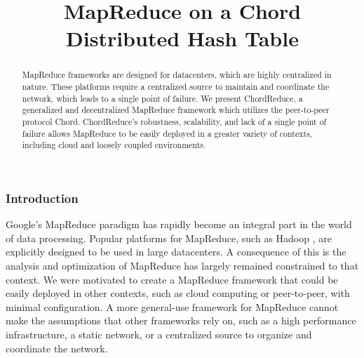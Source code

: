 \documentclass{article}
\title{MapReduce on a Chord Distributed Hash Table}
\date{} %
\begin{document}
\maketitle

\begin{abstract}

MapReduce frameworks are designed for datacenters, which are highly centralized in nature.  These platforms require a centralized source to maintain and coordinate the network, which leads to a single point of failure.  We present ChordReduce, a generalized and decentralized MapReduce framework which utilizes the peer-to-peer protocol Chord.  ChordReduce's robustness, scalability, and lack of a single point of failure allows MapReduce to be easily deployed in a greater variety of contexts, including  cloud and loosely coupled environments.


\end{abstract}




\subsubsection*{Introduction}

Google's MapReduce \cite{mapreduce} paradigm has rapidly become an integral part in the world of data processing.
Popular platforms for MapReduce, such as Hadoop \cite{Hadoop}, are explicitly designed to be used in large datacenters.  
A consequence of this is the analysis and optimization of MapReduce has largely remained constrained to that context.  
We were motivated to create a MapReduce framework that could be easily deployed in other contexts, such as cloud computing or peer-to-peer, with minimal configuration.
A more general-use framework for MapReduce cannot make the assumptions that other frameworks rely on, such as a high performance infrastructure, a static network, or a centralized source to organize and coordinate the network.  
\end{document}
